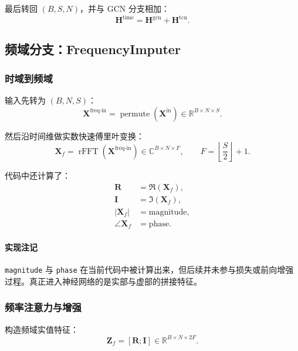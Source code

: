 \documentclass[UTF8]{ctexart}
\begin{document}
最后转回 $(B,S,N)$，并与 GCN 分支相加：
\begin{equation}
    \bm{H}^{\text{time}} = \bm{H}^{\text{gcn}} + \bm{H}^{\text{tcn}}.
\end{equation}

\subsection{频域分支：FrequencyImputer}

\subsubsection{时域到频域}

输入先转为 $(B,N,S)$：
\begin{equation}
    \bm{X}^{\text{freq-in}} = \operatorname{permute}(\bm{X}^{\text{in}}) \in \mathbb{R}^{B \times N \times S}.
\end{equation}

然后沿时间维做实数快速傅里叶变换：
\begin{equation}
    \bm{X}_f = \operatorname{rFFT}(\bm{X}^{\text{freq-in}}) \in \mathbb{C}^{B \times N \times F},
    \qquad F = \left\lfloor \frac{S}{2} \right\rfloor + 1.
\end{equation}

代码中还计算了：
\begin{align}
    \bm{R} &= \Re(\bm{X}_f), \\
    \bm{I} &= \Im(\bm{X}_f), \\
    |\bm{X}_f| &= \text{magnitude}, \\
    \angle \bm{X}_f &= \text{phase}.
\end{align}

\paragraph{实现注记}
\texttt{magnitude} 与 \texttt{phase} 在当前代码中被计算出来，但后续并未参与损失或前向增强过程。真正进入神经网络的是实部与虚部的拼接特征。

\subsubsection{频率注意力与增强}

构造频域实值特征：
\begin{equation}
    \bm{Z}_f = [\bm{R};\bm{I}] \in \mathbb{R}^{B \times N \times 2F}.
\end{equation}
\end{document}
